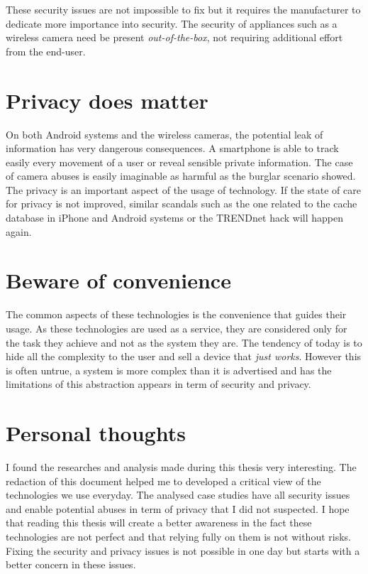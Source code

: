 These security issues are not impossible to fix but it requires the manufacturer to dedicate more importance into security.
The security of appliances such as a wireless camera need be present \emph{out-of-the-box}, not requiring additional effort from the end-user.

\section{Privacy does matter}

On both Android systems and the wireless cameras, the potential leak of information has very dangerous consequences.
A smartphone is able to track easily every movement of a user or reveal sensible private information.
The case of camera abuses is easily imaginable as harmful as the burglar scenario showed.\\

The privacy is an important aspect of the usage of technology.
If the state of care for privacy is not improved, similar scandals such as the one related to the cache database in iPhone and Android systems or the TRENDnet hack will happen again.

\section{Beware of convenience}

The common aspects of these technologies is the convenience that guides their usage.
As these technologies are used as a service, they are considered only for the task they achieve and not as the system they are.
The tendency of today is to hide all the complexity to the user and sell a device that \emph{just works}.
However this is often untrue, a system is more complex than it is advertised and has the limitations of this abstraction appears in term of security and privacy.


\section{Personal thoughts}

I found the researches and analysis made during this thesis very interesting.
The redaction of this document helped me to developed a critical view of the technologies we use everyday.
The analysed case studies have all security issues and enable potential abuses in term of privacy that I did not suspected.
I hope that reading this thesis will create a better awareness in the fact these technologies are not perfect and that relying fully on them is not without risks.
Fixing the security and privacy issues is not possible in one day but starts with a better concern in these issues.